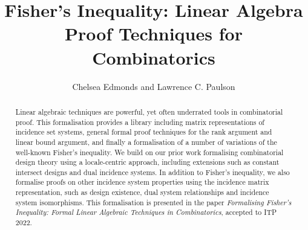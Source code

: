 \documentclass[11pt,a4paper]{article}
\begin{document}
\title{Fisher's Inequality: Linear Algebra Proof Techniques for Combinatorics}
\author{Chelsea Edmonds and Lawrence C. Paulson}
\maketitle

\begin{abstract}
  Linear algebraic techniques are powerful, yet often underrated tools in combinatorial proof. This formalisation provides a library including matrix representations of incidence set systems, general formal proof techniques for the rank argument and linear bound argument, and finally a formalisation of a number of variations of the well-known Fisher's inequality. We build on our prior work formalising combinatorial design theory using a locale-centric approach, including extensions such as constant intersect designs and dual incidence systems. In addition to Fisher's inequality, we also formalise proofs on other incidence system properties using the incidence matrix representation, such as design existence, dual system relationships and incidence system isomorphisms. This formalisation is presented in the paper \textit{Formalising Fisher's Inequality: Formal Linear Algebraic Techniques in Combinatorics}, accepted to ITP 2022.
\end{abstract}

\tableofcontents





\end{document}
